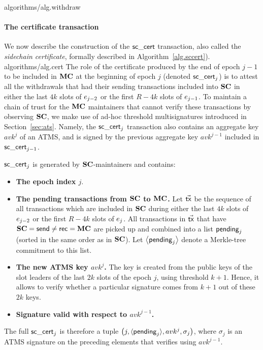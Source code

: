 {algorithms/alg.withdraw}

\paragraph{The certificate transaction}
\label{sec:sccert}

We now describe the construction of the $\mathsf{sc\_cert}$ transaction, also called the
\emph{sidechain certificate}, formally described in
Algorithm~\ref{alg.sccert}).
{algorithms/alg.cert}
The role of the
certificate produced by the end of epoch $j-1$ to be included in $\mathbf{MC}$ at
the beginning of epoch ${j}$ (denoted $\mathsf{sc\_cert}_{j}$)  is to attest
all the withdrawals that had their sending transactions included
into $\mathbf{SC}$
in either the last $4k$ slots of $e_{j-2}$ or the first $R-4k$ slots
of $e_{j-1}$.
To maintain a chain of trust for the $\mathbf{MC}$ maintainers that cannot
verify these transactions by observing $\mathbf{SC}$, we make use of
ad-hoc threshold multisignatures introduced in Section~\ref{sec:ats}.
Namely, the $\mathsf{sc\_cert}_{j}$ transaction
also contains an aggregate key $avk^{j}$ of an ATMS, and is signed by the
previous aggregate key $avk^{j-1}$ included in $\mathsf{sc\_cert}_{j-1}$.

$\mathsf{sc\_cert}_{j}$ is generated by $\mathbf{SC}$-maintainers
and contains:
\begin{itemize}
    \item
          \textbf{The epoch index $j$}.
    \item
          \textbf{The pending transactions from $\mathbf{SC}$ to $\mathbf{MC}$.}
          Let $\vec{\mathsf{tx}}$ be the sequence of all transactions
          which are included in $\mathbf{SC}$ during either
          the last $4k$ slots of $e_{j-2}$ or the first $R-4k$ slots of
          $e_j$. All transactions in $\vec{\mathsf{tx}}$ that have $\mathbf{SC}=\mathsf{send} \neq \mathsf{rec}=\mathbf{MC}$
          are picked up and combined into a list $\mathsf{pending}_{j}$ (sorted in the
          same order as in $\mathbf{SC}$). Let $\left\langle \mathsf{pending}_{j} \right\rangle$ denote a Merkle-tree commitment to
          this list.

    \item
          \textbf{The new ATMS key $avk^{j}$.}
          The key is created from the public keys of the slot
          leaders of the last $2k$ slots of the epoch $j$, using
          threshold $k+1$. Hence, it allows to verify whether a particular signature comes
          from $k+1$ out of these $2k$ keys.
    \item
          \textbf{Signature valid with respect to $avk^{j-1}$.}
\end{itemize}
The full $\mathsf{sc\_cert}_{j}$ is therefore a tuple
$\left(j,\langle\mathsf{pending}_{j}\rangle,avk^{j},\sigma_{j}\right)$,
where $\sigma_{j}$ is an ATMS signature on the preceding elements that verifies
using $avk^{j-1}$.

